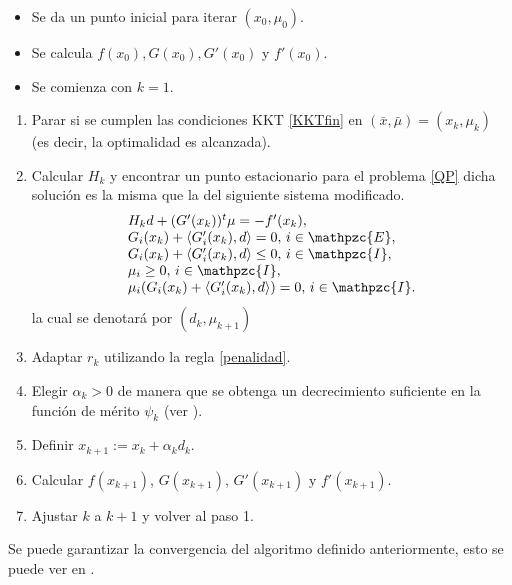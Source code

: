 \documentclass[a4paper,10pt]{book}
\newcommand{\bx}{\bar{x}}
\newcommand{\bmu}{\bar{\mu}}
\newcommand{\cI}{\mathpzc{I}}
\newcommand{\cE}{\mathpzc{E}}
\newcommand{\la}{\langle}
\newcommand{\ra}{\rangle}
\begin{document}
 \begin{itemize}
     \item Se da un punto inicial para iterar $(x_0,\mu_0)$.
     \item Se calcula $f(x_0), G(x_0),G'(x_0)$ y $f'(x_0)$.
     \item Se comienza con $k=1$.
 \end{itemize}
 \begin{enumerate}
 \item Parar si se cumplen las condiciones KKT \eqref{KKTfin} en $(\bx,\bmu)=(x_k,\mu_k)$ (es decir, la optimalidad es alcanzada).
 \item Calcular $H_k$ y encontrar un punto estacionario para el problema \eqref{QP} dicha solución es la misma que la del siguiente sistema modificado.
 \begin{equation}\label{qpmodificado}
     \begin{array}{l}
 H_kd+(G'(x_k))^t\mu=-f'(x_k),\\
G_i(x_k)+\la G_i'(x_k),d\ra =0, \, i\in \cE,\\
G_i(x_k)+\la G_i'(x_k),d\ra \leq 0, \, i\in \cI,\\
 \mu_i\geq0, \, i\in \cI,\\
  \mu_i(G_i(x_k)+\la G_i'(x_k),d\ra)=0, \, i\in \cI.
 \end{array}
 \end{equation}
  la cual se denotará por $(d_k,\mu_{k+1})$
  \item Adaptar $r_k$ utilizando la regla \eqref{penalidad}.
  \item Elegir $\alpha_k>0$ de manera que se obtenga un decrecimiento suficiente en la función de mérito $\psi_k$ (ver \cite[Page 296]{bonnans2006numerical}).
 \item Definir $x_{k+1}:=x_k+\alpha_k d_k$.
 \item Calcular $f(x_{k+1})$, $G(x_{k+1})$, $G'(x_{k+1})\mbox{ y }f'(x_{k+1})$.
 \item Ajustar $k$ a $k+1$ y volver al paso 1.
 \end{enumerate}
 
 
Se puede garantizar la convergencia del algoritmo definido anteriormente, esto se puede ver en \cite[Theorem 17.2]{bonnans2006numerical}.

\end{document}
